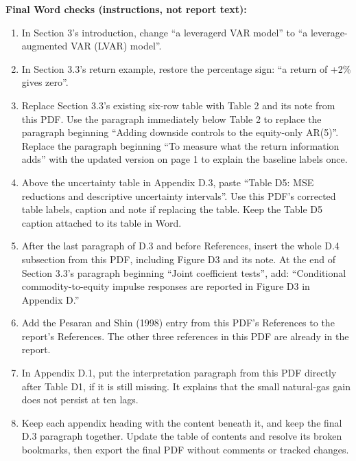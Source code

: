 \documentclass[11pt,a4paper]{article}
\begin{document}
\medskip
\textbf{Final Word checks (instructions, not report text):}
\begin{enumerate}
\item In Section 3's introduction, change ``a leveragerd VAR model'' to ``a leverage-augmented VAR (LVAR) model''.
\item In Section 3.3's return example, restore the percentage sign: ``a return of +2\% gives zero''.
\item Replace Section 3.3's existing six-row table with Table 2 and its note from this PDF. Use the paragraph immediately below Table 2 to replace the paragraph beginning ``Adding downside controls to the equity-only AR(5)''. Replace the paragraph beginning ``To measure what the return information adds'' with the updated version on page 1 to explain the baseline labels once.
\item Above the uncertainty table in Appendix D.3, paste ``Table D5: MSE reductions and descriptive uncertainty intervals''. Use this PDF's corrected table labels, caption and note if replacing the table. Keep the Table D5 caption attached to its table in Word.
\item After the last paragraph of D.3 and before References, insert the whole D.4 subsection from this PDF, including Figure D3 and its note. At the end of Section 3.3's paragraph beginning ``Joint coefficient tests'', add: ``Conditional commodity-to-equity impulse responses are reported in Figure D3 in Appendix D.''
\item Add the Pesaran and Shin (1998) entry from this PDF's References to the report's References. The other three references in this PDF are already in the report.
\item In Appendix D.1, put the interpretation paragraph from this PDF directly after Table D1, if it is still missing. It explains that the small natural-gas gain does not persist at ten lags.
\item Keep each appendix heading with the content beneath it, and keep the final D.3 paragraph together. Update the table of contents and resolve its broken bookmarks, then export the final PDF without comments or tracked changes.
\end{enumerate}
\end{document}
